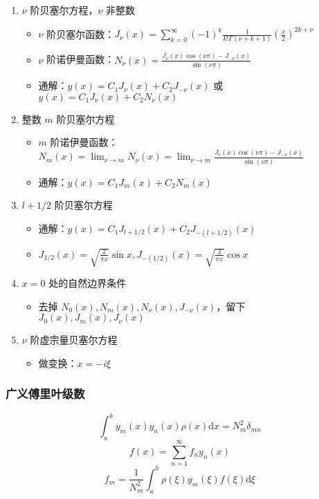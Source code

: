 \documentclass{article}
\begin{document}
\begin{enumerate}
    \item $\nu$ 阶贝塞尔方程，$\nu$ 非整数 \begin{itemize}
        \item $\nu$ 阶贝塞尔函数：$J_\nu(x)=\sum^\infty_{k=0}(-1)^k\frac{1}{k!\Gamma(\nu+k+1)}(\frac{x}{2})^{2k+\nu}$
        \item $\nu$ 阶诺伊曼函数：$N_\nu(x)=\frac{J_\nu(x)\cos(\nu\pi)-J_{-\nu}(x)}{\sin(\nu \pi)}$
        \item 通解：$y(x)=C_1J_\nu(x)+C_2J_{-\nu}(x)$ 或 $y(x)=C_1J_\nu(x)+C_2N_\nu(x)$
    \end{itemize}
    \item 整数 $m$ 阶贝塞尔方程 \begin{itemize}
        \item $m$ 阶诺伊曼函数：$N_m(x)=\lim_{\nu\to m}N_\nu(x)=\lim_{\nu\to m}\frac{J_\nu(x)\cos(\nu\pi)-J_{-\nu}(x)}{\sin(\nu \pi)}$
        \item 通解：$y(x)=C_1J_m(x)+C_2N_m(x)$
    \end{itemize}
    \item $l+1/2$ 阶贝塞尔方程 \begin{itemize}
        \item 通解：$y(x)=C_1J_{l+1/2}(x)+C_2J_{-(l+1/2)}(x)$
        \item $J_{1/2}(x)=\sqrt{\frac{2}{\pi x}}\sin x, J_{-(1/2)}(x)=\sqrt{\frac{2}{\pi x}}\cos x$
    \end{itemize}
    \item $x=0$ 处的自然边界条件 \begin{itemize}
        \item 去掉 $N_0(x), N_m(x), N_\nu(x), J_{-\nu}(x)$，留下 $J_0(x), J_m(x), J_\nu(x)$
    \end{itemize}
    \item $\nu$ 阶虚宗量贝塞尔方程 \begin{itemize}
        \item 做变换：$x=-i\xi$
    \end{itemize}
\end{enumerate}

\subsubsection{广义傅里叶级数}

$$\int^b_ay_m(x)y_n(x)\rho(x)\mathrm{d}x=N_m^2\delta_{mn}$$
$$f(x)=\sum^\infty_{n=1}f_ny_n(x)$$
$$f_m=\frac{1}{N_m^2}\int^b_a\rho(\xi)y_m(\xi)f(\xi)\mathrm{d}\xi$$
\end{document}
